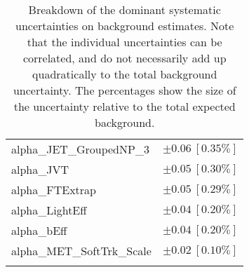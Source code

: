 \begin{table}
\begin{center}
\begin{tabular*}{\textwidth}{@{\extracolsep{\fill}}lc}
alpha\_JET\_GroupedNP\_3         & $\pm 0.06\ [0.35\%] $       \\
alpha\_JVT         & $\pm 0.05\ [0.30\%] $       \\
alpha\_FTExtrap         & $\pm 0.05\ [0.29\%] $       \\
alpha\_LightEff         & $\pm 0.04\ [0.20\%] $       \\
alpha\_bEff         & $\pm 0.04\ [0.20\%] $       \\
alpha\_MET\_SoftTrk\_Scale         & $\pm 0.02\ [0.10\%] $       \\
\noalign{\smallskip}\hline\noalign{\smallskip}
\end{tabular*}
\end{center}
\caption[Breakdown of uncertainty on background estimates]{
Breakdown of the dominant systematic uncertainties on background estimates.
Note that the individual uncertainties can be correlated, and do not necessarily add up quadratically to 
the total background uncertainty. The percentages show the size of the uncertainty relative to the total expected background.
\label{table.results.bkgestimate.uncertainties.SRC3}}
\end{table}
%